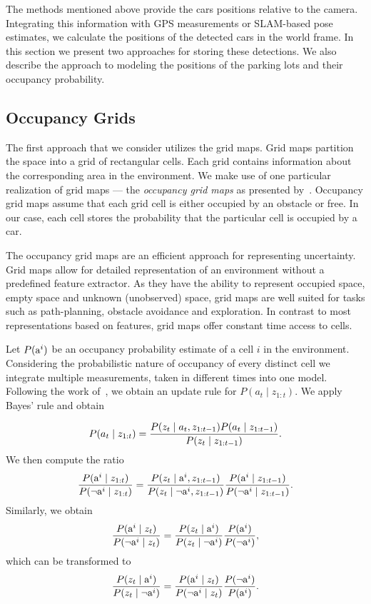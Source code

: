 The methods mentioned above provide the cars positions relative to the camera.
Integrating this information with GPS measurements or SLAM-based pose
estimates, we calculate the positions of the detected cars in the world frame.
In this section we present two approaches for storing these detections. We
also describe the approach to modeling the positions of the parking lots and
their occupancy probability.

\subsection{Occupancy Grids}
\label{sub:occupancy_grids}

The first approach that we consider utilizes the grid maps. Grid maps
partition the space into a grid of rectangular cells. Each grid contains
information about the corresponding area in the environment. We make use of
one particular realization of grid maps --- the \emph{occupancy grid maps} as
presented by~\citet{occupancy_grids}. Occupancy grid maps assume that each
grid cell is either occupied by an obstacle or free. In our case, each cell
stores the probability that the particular cell is occupied by a car.

The occupancy grid maps are an efficient approach for representing
uncertainty. Grid maps allow for detailed representation of an environment
without a predefined feature extractor. As they have the ability to represent
occupied space, empty space and unknown (unobserved) space, grid maps are well
suited for tasks such as path-planning, obstacle avoidance and exploration. In
contrast to most representations based on features, grid maps offer constant
time access to cells.

Let $P({\mbox{a}^i})$ be an occupancy probability estimate of a cell $i$ in the
environment. Considering the probabilistic nature of occupancy of every
distinct cell we integrate multiple measurements, taken in different times
into one model. Following the work of~\citet{occupancy_grids}, we obtain an
update rule for $P(a_t\mid z_{1:t})$. We apply Bayes' rule and obtain

\begin{equation}
P(a_t \mid  z_{1:t} ) = \frac{P(z_t \mid a_t, z_{1:t-1}) P(a_t \mid z_{1:t-1})}{P(z_t \mid z_{1:t-1})}.
\end{equation}
\noindent
We then compute the ratio
\begin{equation}
\frac{P({\mbox{a}^i}\mid z_{1:t})}{P(\neg{\mbox{a}^i} \mid z_{1:t})}
=
\frac{P(z_{t} \mid {\mbox{a}^i}, z_{1:t-1})}{P(z_{t} \mid \neg{\mbox{a}^i}, z_{1:t-1})}   \frac{P({\mbox{a}^i}\mid z_{1:t-1})}{ P(\neg{\mbox{a}^i}\mid z_{1:t-1})}.
\end{equation}
\noindent
Similarly, we obtain
\begin{equation}
\nonumber
\frac{P({\mbox{a}^i}\mid z_{t})}{P(\neg{\mbox{a}^i} \mid z_{t})} = \frac{P(z_{t} \mid {\mbox{a}^i})}{P(z_{t} \mid \neg{\mbox{a}^i})}   \frac{P({\mbox{a}^i})}{ P(\neg{\mbox{a}^i})},
\end{equation}
\noindent
which can be transformed to
\begin{equation}
\frac{P(z_{t} \mid {\mbox{a}^i})}{P(z_{t} \mid \neg{\mbox{a}^i})}
=
\frac{P({\mbox{a}^i} \mid z_{t})}{P(\neg{\mbox{a}^i} \mid z_{t})}   \frac{P(\neg{\mbox{a}^i})}{ P({\mbox{a}^i})}.
\end{equation}
\noindent

